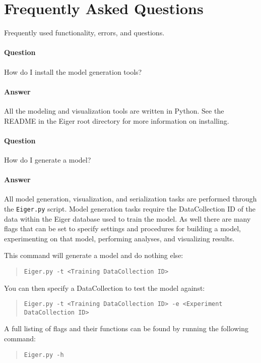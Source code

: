 \section{Frequently Asked Questions}
\label{sec:faq}
Frequently used functionality, errors, and questions.
\paragraph{Question}
How do I install the model generation tools?
\paragraph{Answer}
All the modeling
and visualization tools are written in Python. See the README in the Eiger
root directory for more information on installing. 

\paragraph{Question}
How do I generate a model?
\paragraph{Answer}
All model generation, visualization, and serialization tasks are
performed through the \texttt{Eiger.py} script. Model generation tasks require
the DataCollection ID of the data within the Eiger database used to train
the model. As well there are many flags that can be set to specify
settings and procedures for building a model, experimenting on that model,
performing analyses, and visualizing results. 

This command will generate a model and do nothing else:

	\begin{quote}
	\texttt{Eiger.py -t <Training DataCollection ID>}
	\end{quote}

You can then specify a DataCollection to test the model against:

	\begin{quote}
	\texttt{Eiger.py -t <Training DataCollection ID> -e <Experiment DataCollection ID>}
	\end{quote}

A full listing of flags and their functions can be found by running the
following command:

	\begin{quote}
	\texttt{Eiger.py -h}
	\end{quote}

